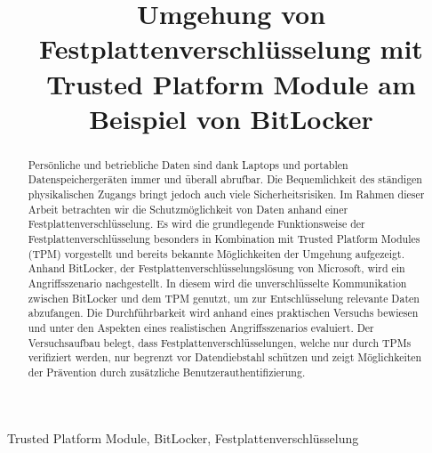 \documentclass[conference]{IEEEtran}
\begin{document}
\title{Umgehung von Festplattenverschlüsselung mit Trusted Platform Module am Beispiel von BitLocker\\}

\author{
}

\maketitle

\begin{abstract}
	Persönliche und betriebliche Daten sind dank Laptops und portablen Datenspeichergeräten immer und überall abrufbar. Die Bequemlichkeit des ständigen physikalischen Zugangs bringt jedoch auch viele Sicherheitsrisiken. Im Rahmen dieser Arbeit betrachten wir die Schutzmöglichkeit von Daten anhand einer Festplattenverschlüsselung. Es wird die grundlegende Funktionsweise der Festplattenverschlüsselung besonders in Kombination mit Trusted Platform Modules (TPM) vorgestellt und bereits bekannte Möglichkeiten der Umgehung aufgezeigt. Anhand BitLocker, der Festplattenverschlüsselungslösung von Microsoft, wird ein Angriffsszenario nachgestellt. In diesem wird die unverschlüsselte Kommunikation zwischen BitLocker und dem TPM genutzt, um zur Entschlüsselung relevante Daten abzufangen. Die Durchführbarkeit wird anhand eines praktischen Versuchs bewiesen und unter den Aspekten eines realistischen Angriffsszenarios evaluiert. Der Versuchsaufbau belegt, dass Festplattenverschlüsselungen, welche nur durch TPMs verifiziert werden, nur begrenzt vor Datendiebstahl schützen und zeigt Möglichkeiten der Prävention durch zusätzliche Benutzerauthentifizierung. \\
\end{abstract}


\begin{IEEEkeywords}
	Trusted Platform Module, BitLocker, Festplattenverschlüsselung
\end{IEEEkeywords}
\end{document}

